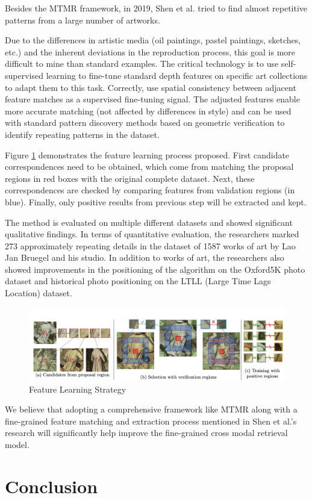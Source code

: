 Besides the MTMR framework, in 2019, Shen et al. \cite{shen2019discovering} tried to find almost repetitive patterns from a large number of artworks. 

Due to the differences in artistic media (oil paintings, pastel paintings, sketches, etc.) and the inherent deviations in the reproduction process, this goal is more difficult to mine than standard examples. The critical technology is to use self-supervised learning to fine-tune standard depth features on specific art collections to adapt them to this task. Correctly, use spatial consistency between adjacent feature matches as a supervised fine-tuning signal. The adjusted features enable more accurate matching (not affected by differences in style) and can be used with standard pattern discovery methods based on geometric verification to identify repeating patterns in the dataset.

Figure \ref{fig:featurelearning} demonstrates the feature learning process proposed. First candidate correspondences need to be obtained, which come from matching the proposal regions in red boxes with the original complete dataset. Next, these correspondences are checked by comparing features from validation regions (in blue). Finally, only positive results from previous step will be extracted and kept. 

The method is evaluated on multiple different datasets and showed significant qualitative findings. In terms of quantitative evaluation, the researchers marked 273 approximately repeating details in the dataset of 1587 works of art by Lao Jan Bruegel and his studio. In addition to works of art, the researchers also showed improvements in the positioning of the algorithm on the Oxford5K photo dataset and historical photo positioning on the LTLL (Large Time Lags Location) dataset.

\begin{figure}[h!]
\centering
\includegraphics[width=\textwidth]{featurelearningartwork.pdf}
\caption{Feature Learning Strategy\cite{shen2019discovering}}
\label{fig:featurelearning}
\end{figure}

We believe that adopting a comprehensive framework like MTMR \cite{parttowhole} along with a fine-grained feature matching and extraction process mentioned in Shen et al.'s research \cite{shen2019discovering} will significantly help improve the fine-grained cross modal retrieval model.

\section{Conclusion}


